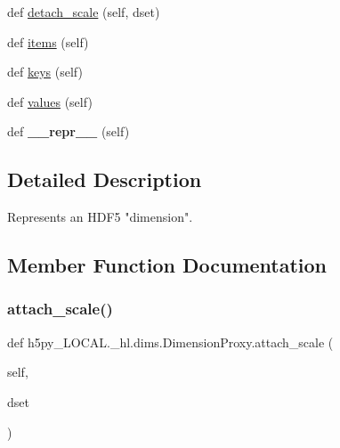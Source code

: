 \begin{DoxyCompactItemize}
\item 
def \hyperlink{classh5py__LOCAL_1_1__hl_1_1dims_1_1DimensionProxy_a1db60fdee59927ec93f8f6e4711dc971}{detach\+\_\+scale} (self, dset)
\item 
def \hyperlink{classh5py__LOCAL_1_1__hl_1_1dims_1_1DimensionProxy_a8e7522bf4628a764aa52ae3ad59ea3d9}{items} (self)
\item 
def \hyperlink{classh5py__LOCAL_1_1__hl_1_1dims_1_1DimensionProxy_a5ba36e2d7bcd7f7ea041ace8b9a51e5a}{keys} (self)
\item 
def \hyperlink{classh5py__LOCAL_1_1__hl_1_1dims_1_1DimensionProxy_ac728d5d0e3bfda90c2fe7e944dff5ab1}{values} (self)
\item 
\mbox{\label{classh5py__LOCAL_1_1__hl_1_1dims_1_1DimensionProxy_ad3569e291bd4f7143b4a2572a16bd683}} 
def {\bfseries \+\_\+\+\_\+repr\+\_\+\+\_\+} (self)
\end{DoxyCompactItemize}


\subsection{Detailed Description}
\begin{DoxyVerb}    Represents an HDF5 "dimension".
\end{DoxyVerb}
 

\subsection{Member Function Documentation}
\mbox{\label{classh5py__LOCAL_1_1__hl_1_1dims_1_1DimensionProxy_aef897aec6cc38b1cbb9c6d7aa6d24772}} 
\subsubsection{\texorpdfstring{attach\+\_\+scale()}{attach\_scale()}}
{\footnotesize\ttfamily def h5py\+\_\+\+L\+O\+C\+A\+L.\+\_\+hl.\+dims.\+Dimension\+Proxy.\+attach\+\_\+scale (\begin{DoxyParamCaption}\item[{}]{self,  }\item[{}]{dset }\end{DoxyParamCaption})}

